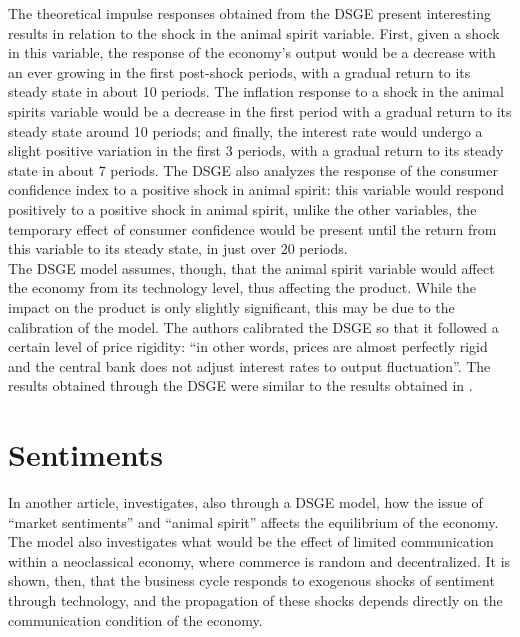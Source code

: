 The theoretical impulse responses obtained from the DSGE present interesting results in relation to the shock in the animal spirit variable. First, given a shock in this variable, the response of the economy's output would be a decrease with an ever growing in the first post-shock periods, with a gradual return to its steady state in about 10 periods. The inflation response to a shock in the animal spirits variable would be a decrease in the first period with a gradual return to its steady state around 10 periods; and finally, the interest rate would undergo a slight positive variation in the first 3 periods, with a gradual return to its steady state in about 7 periods. The DSGE also analyzes the response of the consumer confidence index to a positive shock in animal spirit: this variable would respond positively to a positive shock in animal spirit, unlike the other variables, the temporary effect of consumer confidence would be present until the return from this variable to its steady state, in just over 20 periods.\\

The DSGE model assumes, though, that the animal spirit variable would affect the economy from its technology level, thus affecting the product. While the impact on the product is only slightly significant, this may be due to the calibration of the model. The authors calibrated the DSGE so that it followed a certain level of price rigidity: ``in other words, prices are almost perfectly rigid and the central bank does not adjust interest rates to output fluctuation''\cite[p.1365]{ barsky2012information}. The results obtained through the DSGE were similar to the results obtained in \cite{l2009news}.\\

\section{Sentiments}

In another article, \cite{angeletos2013sentiments} investigates, also through a DSGE model, how the issue of ``market sentiments'' and ``animal spirit'' affects the equilibrium of the economy. The model also investigates what would be the effect of limited communication within a neoclassical economy, where commerce is random and decentralized. It is shown, then, that the business cycle responds to exogenous shocks of sentiment through technology, and the propagation of these shocks depends directly on the communication condition of the economy.\\

